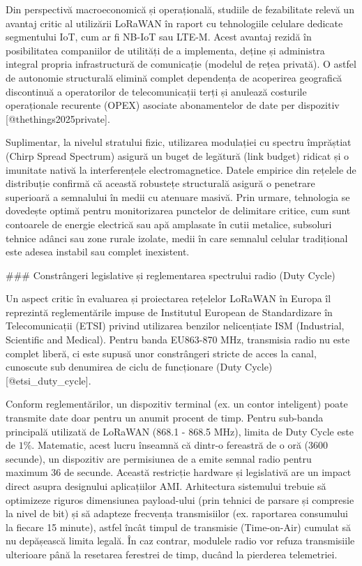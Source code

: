 Din perspectivă macroeconomică și operațională, studiile de fezabilitate
relevă un avantaj critic al utilizării LoRaWAN în raport cu tehnologiile
celulare dedicate segmentului IoT, cum ar fi NB-IoT sau LTE-M. Acest
avantaj rezidă în posibilitatea companiilor de utilități de a
implementa, deține și administra integral propria infrastructură de
comunicație (modelul de rețea privată). O astfel de autonomie
structurală elimină complet dependența de acoperirea geografică
discontinuă a operatorilor de telecomunicații terți și anulează
costurile operaționale recurente (OPEX) asociate abonamentelor de date
per dispozitiv [@thethings2025private].

Suplimentar, la nivelul stratului fizic, utilizarea modulației cu
spectru împrăștiat (Chirp Spread Spectrum) asigură un buget de legătură
(link budget) ridicat și o imunitate nativă la interferențele
electromagnetice. Datele empirice din rețelele de distribuție confirmă
că această robustețe structurală asigură o penetrare superioară a
semnalului în medii cu atenuare masivă. Prin urmare, tehnologia se
dovedește optimă pentru monitorizarea punctelor de delimitare critice,
cum sunt contoarele de energie electrică sau apă amplasate în cutii
metalice, subsoluri tehnice adânci sau zone rurale izolate, medii în
care semnalul celular tradițional este adesea instabil sau complet
inexistent.

### Constrângeri legislative și reglementarea spectrului radio (Duty Cycle)

Un aspect critic în evaluarea și proiectarea rețelelor LoRaWAN în Europa
îl reprezintă reglementările impuse de Institutul European de
Standardizare în Telecomunicații (ETSI) privind utilizarea benzilor
nelicențiate ISM (Industrial, Scientific and Medical). Pentru banda
EU863-870 MHz, transmisia radio nu este complet liberă, ci este supusă
unor constrângeri stricte de acces la canal, cunoscute sub denumirea de
ciclu de funcționare (Duty Cycle) [@etsi_duty_cycle].

Conform reglementărilor, un dispozitiv terminal (ex. un contor
inteligent) poate transmite date doar pentru un anumit procent de timp.
Pentru sub-banda principală utilizată de LoRaWAN (868.1 - 868.5 MHz),
limita de Duty Cycle este de $1\%$. Matematic, acest lucru înseamnă că
dintr-o fereastră de o oră (3600 secunde), un dispozitiv are permisiunea
de a emite semnal radio pentru maximum 36 de secunde. Această restricție
hardware și legislativă are un impact direct asupra designului
aplicațiilor AMI. Arhitectura sistemului trebuie să optimizeze riguros
dimensiunea payload-ului (prin tehnici de parsare și compresie la nivel
de bit) și să adapteze frecvența transmisiilor (ex. raportarea
consumului la fiecare 15 minute), astfel încât timpul de transmisie
(Time-on-Air) cumulat să nu depășească limita legală. În caz contrar,
modulele radio vor refuza transmisiile ulterioare până la resetarea
ferestrei de timp, ducând la pierderea telemetriei.


